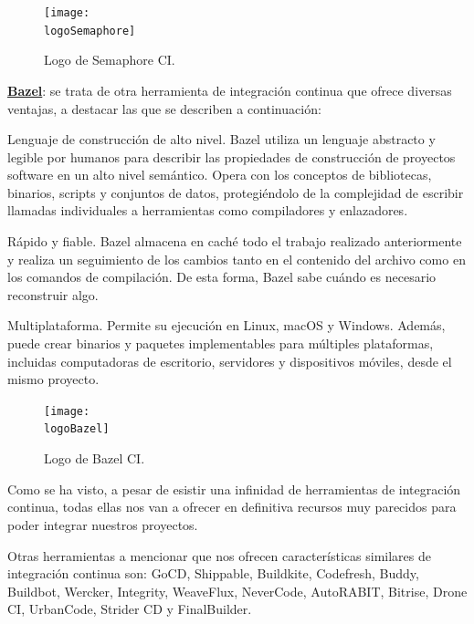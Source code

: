 \begin{compactitem}
    \begin{figure}[h]
        \centering
        \texttt{[image: \\logoSemaphore]}
        \caption{Logo de Semaphore CI.}
    \end{figure}
    \item \textbf{\underline{Bazel}}: se trata de otra herramienta de integración continua que ofrece diversas ventajas, a destacar las que se describen a continuación:
    \begin{compactitem}
        \item Lenguaje de construcción de alto nivel. Bazel utiliza un lenguaje abstracto y legible por humanos para describir las propiedades de construcción de proyectos software en un alto nivel semántico. Opera con los conceptos de bibliotecas, binarios, scripts y conjuntos de datos, protegiéndolo de la complejidad de escribir llamadas individuales a herramientas como compiladores y enlazadores.
        \item Rápido y fiable. Bazel almacena en caché todo el trabajo realizado anteriormente y realiza un seguimiento de los cambios tanto en el contenido del archivo como en los comandos de compilación. De esta forma, Bazel sabe cuándo es necesario reconstruir algo.
        \item Multiplataforma. Permite su ejecución en Linux, macOS y Windows. Además, puede crear binarios y paquetes implementables para múltiples plataformas, incluidas computadoras de escritorio, servidores y dispositivos móviles, desde el mismo proyecto.
    \end{compactitem}
    \begin{figure}[h]
        \centering
        \texttt{[image: \\logoBazel]}
        \caption{Logo de Bazel CI.}
    \end{figure}

\end{compactitem}

Como se ha visto, a pesar de esistir una infinidad de herramientas de integración continua, todas ellas nos van a ofrecer en definitiva recursos muy parecidos para poder integrar nuestros proyectos.

Otras herramientas a mencionar que nos ofrecen características similares de integración continua son: GoCD, Shippable, Buildkite, Codefresh, Buddy, Buildbot, Wercker, Integrity, WeaveFlux, NeverCode, AutoRABIT, Bitrise, Drone CI, UrbanCode, Strider CD y FinalBuilder.
